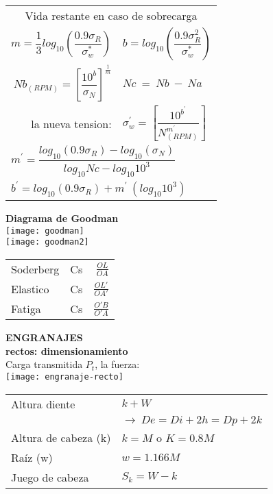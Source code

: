 \documentclass[11pt,a4paper]{article}
\begin{document}
\begin{multicols}{2}
\begin{cajita}
	\begin{tabular}{r l }
		\multicolumn{2}{c}{Vida restante en caso de sobrecarga}\\[0.2cm]
		$m=\dfrac{1}{3}log_{10}\left(\dfrac{0.9\sigma_{R}}{\sigma_{w}^{*}}\right)$&
		$b=log_{10}\left(\dfrac{0.9\sigma_{R}^{2}}{\sigma_{w}^{*}}\right)$\\[0.5cm]
		$Nb_{(RPM)}=\left[\dfrac{10^{b}}{\sigma_{N}}\right]^{\frac{1}{m}}$&$Nc~=~Nb~-~Na$\\
		la nueva tension: & $\sigma_{w}^{'}=\left[\dfrac{10^{b^{'}}}{N_{(RPM)}^{m^{'}}}\right]$\\[0.5cm]
		\multicolumn{2}{l}{$m^{'}=\dfrac{log_{10}(0.9\sigma_{R})-log_{10}(\sigma_{N})}{log_{10}Nc-log_{10}10^{3}}$}\\[0.3cm]
		\multicolumn{2}{l}{$b^{'}=log_{10}(0.9\sigma_{R})+m^{'}~(log_{10}10^{3})$}\\[0.25cm]
		
	\end{tabular}
\end{cajita}
\newpage
\begin{cajita}

	\textbf{Diagrama de Goodman}\\
\texttt{[image: goodman]}\\
\texttt{[image: goodman2]}\\

\vspace*{0.2cm}
\begin{tabular}{l c r}	
	Soderberg&Cs&$\frac{OL}{OA}$\\[0.2cm]
	Elastico&Cs&$\frac{OL'}{OA'}$\\[0.2cm]
	Fatiga&Cs&$\frac{O'B}{O'A}$\\[0.2cm]
\end{tabular}
	\end{cajita}
	\newpage
		\textbf{ENGRANAJES}\\
	\textbf{rectos: dimensionamiento}\\
			Carga transmitida $P_t$, la fuerza:\\
			\texttt{[image: engranaje-recto]}\\
			\begin{tabular}{l l}
				Altura diente & $k + W$\\
							&$\rightarrow~De=Di+2h=Dp+2k$\\
				Altura de cabeza (k) & $k= M$ o $K=0.8M$\\
				Raíz (w) & $w=1.166M$\\
				Juego de cabeza& $S_k=W-k$\\
			\end{tabular}\vspace*{0.2cm}



\end{multicols}
\end{document}
